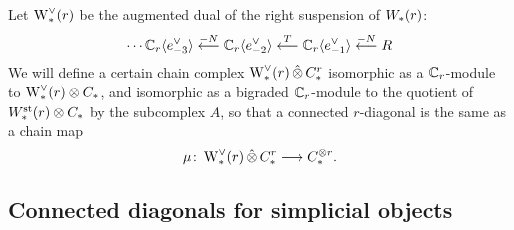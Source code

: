 Let $\operatorname{W}^\vee_{*}(r)$ be the augmented dual of the right suspension of $W_{*}(r)$:
\[
\dotsb
\mathbb{C}_r\langle e_{-3}^\vee\rangle
\overset{-N}{\longleftarrow}
\mathbb{C}_r\langle e_{-2}^\vee\rangle
\overset{T}{\longleftarrow}
\mathbb{C}_r\langle e_{-1}^{\vee}\rangle
\overset{-N}{\longleftarrow}
R
\]
We will define a certain chain complex $\operatorname{W}^\vee_{*}(r)\operatorname{\hat{\otimes}} C^{r}_{*}$ isomorphic as a $\mathbb{C}_r$-module to $\operatorname{W}^\vee_{*}(r)\otimes C_{*}$, and isomorphic as a bigraded $\mathbb{C}_r$-module to the quotient of $W^{\mathrm{st}}_{*}(r)\otimes C_{*}$ by the subcomplex $A$, so that a connected $r$-diagonal is the same as a chain map
\[
\mu\colon \operatorname{W}^\vee_{*}(r)\operatorname{\hat{\otimes}} C^{r}_{*}\longrightarrow C_{*}^{\otimes r}.
\]




\subsection{Connected diagonals for simplicial objects}

